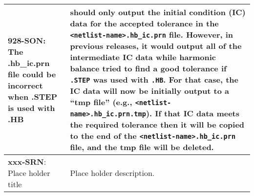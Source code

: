 {\begin{longtable}[h] {>{\raggedright\small}m{2in}|>{\raggedright\let\\\tabularnewline\small}m{3.5in}}
\textbf{928-SON}: The .hb\_ic.prn file could be incorrect when .STEP is
used with .HB & \Xyce{} should only output the initial condition (IC)
data for the accepted tolerance in the \texttt{<netlist-name>.hb\_ic.prn}
file.  However, in previous releases, it would output all of the
intermediate IC data while harmonic balance tried to find a good
tolerance if \texttt{.STEP} was used with \texttt{.HB}. For that
case, the IC data will now be initially output to a ``tmp file''
(e.g., \texttt{<netlist-name>.hb\_ic.prn.tmp}). If that IC data meets
the required tolerance then it will be copied to the end of the
\texttt{<netlist-name>.hb\_ic.prn} file, and the tmp file 
will be deleted. \\ \hline

\textbf{xxx-SRN}: Place holder title &
Place holder description.  \\ \hline

\end{longtable}
}
